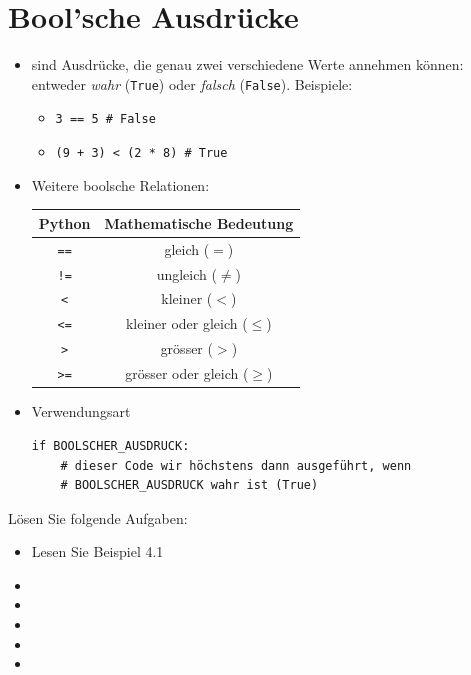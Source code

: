 \section{Bool'sche Ausdrücke}
\begin{itemize}
    \item {} sind Ausdrücke, die genau zwei verschiedene Werte annehmen können: entweder \textit{wahr} (\lstinline|True|) oder \textit{falsch} (\lstinline|False|). Beispiele:
    \begin{itemize}
        \item \lstinline|3 == 5 # False|
        \item \lstinline|(9 + 3) < (2 * 8) # True|
    \end{itemize}
    \item Weitere boolsche Relationen:
    \begin{table}[H]
        \centering
        \footnotesize
        \begin{tabular}{c||c}
        \textbf{Python} & \textbf{Mathematische Bedeutung} \\\midrule 
             \lstinline|==| & gleich ($=$)\\
             \lstinline|!=| & ungleich ($\neq$) \\
             \lstinline|<| & kleiner ($<$)\\
             \lstinline|<=| & kleiner oder gleich ($\leq$) \\
             \lstinline|>| & grösser ($>$) \\
             \lstinline|>=| & grösser oder gleich ($\geq$)
        \end{tabular}
    \end{table}
    \item Verwendungsart
\begin{lstlisting}
if BOOLSCHER_AUSDRUCK:
    # dieser Code wir höchstens dann ausgeführt, wenn 
    # BOOLSCHER_AUSDRUCK wahr ist (True)
\end{lstlisting}
\end{itemize}

Lösen Sie folgende Aufgaben:
\begin{itemize}
    \item Lesen Sie Beispiel 4.1
    \item {}
    \item {}
    \item {}
    \item {}
    \item {}
\end{itemize}